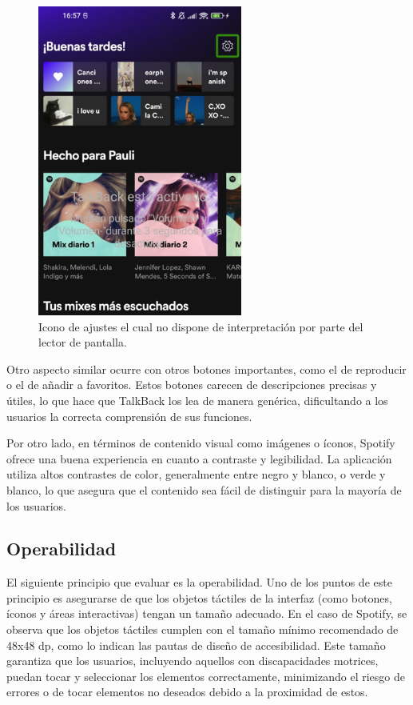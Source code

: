 \documentclass[letterpaper, 12pt]{report}
\begin{document}
\begin{figure}[H]
\centering
\includegraphics[width=0.6\textwidth]{figure28.png}
\caption{Icono de ajustes el cual no dispone de interpretación por parte del lector de pantalla.}
\label{fig:28}
\end{figure}

Otro aspecto similar ocurre con otros botones importantes, como el de reproducir o el de añadir a favoritos. Estos botones carecen de descripciones precisas y útiles, lo que hace que TalkBack los lea de manera genérica, dificultando a los usuarios la correcta comprensión de sus funciones.

Por otro lado, en términos de contenido visual como imágenes o íconos, Spotify ofrece una buena experiencia en cuanto a contraste y legibilidad. La aplicación utiliza altos contrastes de color, generalmente entre negro y blanco, o verde y blanco, lo que asegura que el contenido sea fácil de distinguir para la mayoría de los usuarios.

\subsection{Operabilidad}

El siguiente principio que evaluar es la operabilidad. Uno de los puntos de este principio es asegurarse de que los objetos táctiles de la interfaz (como botones, íconos y áreas interactivas) tengan un tamaño adecuado. En el caso de Spotify, se observa que los objetos táctiles cumplen con el tamaño mínimo recomendado de 48x48 dp, como lo indican las pautas de diseño de accesibilidad. Este tamaño garantiza que los usuarios, incluyendo aquellos con discapacidades motrices, puedan tocar y seleccionar los elementos correctamente, minimizando el riesgo de errores o de tocar elementos no deseados debido a la proximidad de estos.
\end{document}
